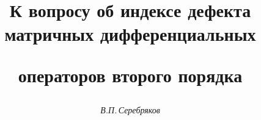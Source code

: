

 




 


\newcommand{\const}{\operatorname{const}} 


\newcommand{\im}{\operatorname{Im}} 


\newcommand{\tts}[1]{} 


 




\setcounter{page}{62} 












 


\author{\it В.П.\,Серебряков} 




\title{К вопросу об индексе дефекта матричных дифференциальных 


операторов второго порядка} 


 


\date{} 




\pagestyle{plain} %


 




\maketitle 


